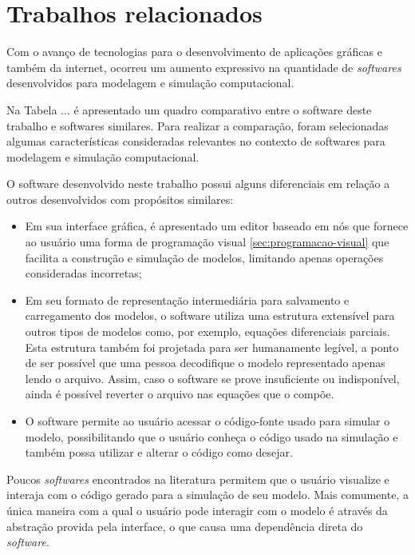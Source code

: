 \documentclass[
	12pt,				%
	openright,			%
	oneside,			%
	a4paper,			%
	main=brazil,
	english,			%
	]{ufsj-abntex2}
\begin{document}
\chapter{Trabalhos relacionados}
\label{chap:relacionados}

Com o avanço de tecnologias para o desenvolvimento de aplicações gráficas e também da internet, ocorreu um aumento expressivo na quantidade de \textit{softwares} desenvolvidos para modelagem e simulação computacional. 

Na Tabela ... é apresentado um quadro comparativo entre o software deste trabalho e softwares similares. Para realizar a comparação, foram selecionadas algumas características consideradas relevantes no contexto de softwares para modelagem e simulação computacional. 


O software desenvolvido neste trabalho possui alguns diferenciais em relação a outros desenvolvidos com propósitos similares:

\begin{itemize}
    \item Em sua interface gráfica, é apresentado um editor baseado em nós que fornece ao usuário uma forma de programação visual \ref{sec:programacao-visual} que facilita a construção e simulação de modelos, limitando apenas operações consideradas incorretas;
    
    \item Em seu formato de representação intermediária para salvamento e carregamento dos modelos, o software utiliza uma estrutura extensível para outros tipos de modelos como, por exemplo, equações diferenciais parciais. Esta estrutura também foi projetada para ser humanamente legível, a ponto de ser possível que uma pessoa decodifique o modelo representado apenas lendo o arquivo. Assim, caso o software se prove insuficiente ou indisponível, ainda é possível reverter o arquivo nas equações que o compõe. 
    
    \item O software permite ao usuário acessar o código-fonte usado para simular o modelo, possibilitando que o usuário conheça o código usado na simulação e também possa utilizar e alterar o código como desejar.   
\end{itemize}

Poucos \textit{softwares} encontrados na literatura permitem que o usuário visualize e interaja com o código gerado para a simulação de seu modelo. Mais comumente, a única maneira com a qual o usuário pode interagir com o modelo é através da abstração provida pela interface, o que causa uma dependência direta do \textit{software}.
\end{document}
